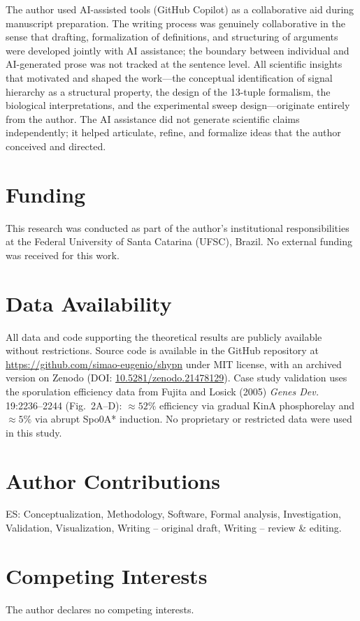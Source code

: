 \documentclass[10pt,letterpaper]{article}
\begin{document}
The author used AI-assisted tools (GitHub Copilot) as a collaborative aid during
manuscript preparation. The writing process was genuinely collaborative in the
sense that drafting, formalization of definitions, and structuring of arguments
were developed jointly with AI assistance; the boundary between individual and
AI-generated prose was not tracked at the sentence level. All scientific insights
that motivated and shaped the work---the conceptual identification of signal
hierarchy as a structural property, the design of the 13-tuple formalism, the
biological interpretations, and the experimental sweep design---originate
entirely from the author. The AI assistance did not generate scientific claims
independently; it helped articulate, refine, and formalize ideas that the author
conceived and directed.

\section*{Funding}

This research was conducted as part of the author's institutional responsibilities at the Federal University of Santa Catarina (UFSC), Brazil. No external funding was received for this work.

\section*{Data Availability}

All data and code supporting the theoretical results are publicly available without restrictions. Source code is available in the GitHub repository at \url{https://github.com/simao-eugenio/shypn} under MIT license, with an archived version on Zenodo (DOI: \href{https://doi.org/10.5281/zenodo.21478129}{10.5281/zenodo.21478129}). Case study validation uses the sporulation efficiency data from Fujita and Losick (2005) \textit{Genes Dev.} 19:2236--2244 (Fig.~2A--D): $\approx 52\%$ efficiency via gradual KinA phosphorelay and $\approx 5\%$ via abrupt Spo0A* induction. No proprietary or restricted data were used in this study.

\section*{Author Contributions}

ES: Conceptualization, Methodology, Software, Formal analysis, Investigation, Validation, Visualization, Writing -- original draft, Writing -- review \& editing.

\section*{Competing Interests}

The author declares no competing interests.



\end{document}
